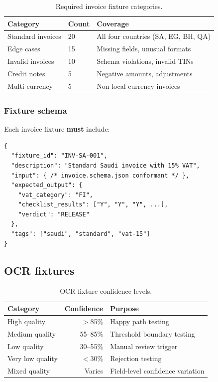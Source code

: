 \begin{table}[htbp]
\centering
\caption{Required invoice fixture categories.}
\label{tab:invoice-fixtures}
\footnotesize
\begin{tabularx}{\linewidth}{@{}l l X@{}}
\toprule
\textbf{Category} & \textbf{Count} & \textbf{Coverage} \\ \midrule
Standard invoices & 20 & All four countries (SA, EG, BH, QA) \\
Edge cases & 15 & Missing fields, unusual formats \\
Invalid invoices & 10 & Schema violations, invalid TINs \\
Credit notes & 5 & Negative amounts, adjustments \\
Multi-currency & 5 & Non-local currency invoices \\
\bottomrule
\end{tabularx}
\end{table}

\subsubsection{Fixture schema}

Each invoice fixture \textbf{must} include:
\begin{lstlisting}[basicstyle=\ttfamily\small]
{
  "fixture_id": "INV-SA-001",
  "description": "Standard Saudi invoice with 15% VAT",
  "input": { /* invoice.schema.json conformant */ },
  "expected_output": {
    "vat_category": "FI",
    "checklist_results": ["Y", "Y", "Y", ...],
    "verdict": "RELEASE"
  },
  "tags": ["saudi", "standard", "vat-15"]
}
\end{lstlisting}

\subsection{OCR fixtures}

\begin{table}[htbp]
\centering
\caption{OCR fixture confidence levels.}
\label{tab:ocr-fixtures}
\footnotesize
\begin{tabularx}{\linewidth}{@{}l r X@{}}
\toprule
\textbf{Category} & \textbf{Confidence} & \textbf{Purpose} \\ \midrule
High quality & $>$85\% & Happy path testing \\
Medium quality & 55--85\% & Threshold boundary testing \\
Low quality & 30--55\% & Manual review trigger \\
Very low quality & $<$30\% & Rejection testing \\
Mixed quality & Varies & Field-level confidence variation \\
\bottomrule
\end{tabularx}
\end{table}

